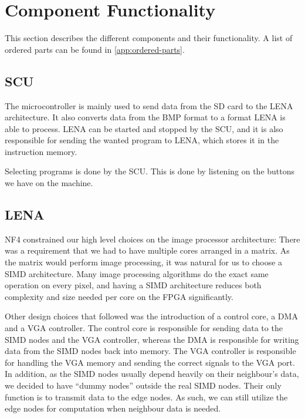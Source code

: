 \section{Component Functionality}

This section describes the different components and their functionality. A list
of ordered parts can be found in \ref{app:ordered-parts}.

\subsection{SCU}

The microcontroller is mainly used to send data from the SD card to the LENA
architecture. It also converts data from the BMP format to a format LENA is able to process. LENA can be started and stopped by
the SCU, and it is also responsible for sending the wanted program to LENA,
which stores it in the instruction memory. 

Selecting programs is done by the SCU. This is done by listening on the buttons
we have on the machine.

\subsection{LENA}

NF4 constrained our high level choices on the image processor architecture:
There was a requirement that we had to have multiple cores arranged in a
matrix. As the matrix would perform image processing, it was natural for us to
choose a SIMD architecture. Many image processing algorithms do the exact same
operation on every pixel, and having a SIMD architecture reduces both
complexity and size needed per core on the FPGA significantly.

Other design choices that followed was the introduction of a control core, a DMA
and a VGA controller. The control core is responsible for sending data to the
SIMD nodes and the VGA controller, whereas the DMA is responsible for writing
data from the SIMD nodes back into memory. The VGA controller is responsible for
handling the VGA memory and sending the correct signals to the VGA port. In
addition, as the SIMD nodes usually depend heavily on their neighbour's data, we
decided to have ``dummy nodes'' outside the real SIMD nodes. Their only function
is to transmit data to the edge nodes. As such, we can still utilize the edge
nodes for computation when neighbour data is needed.

